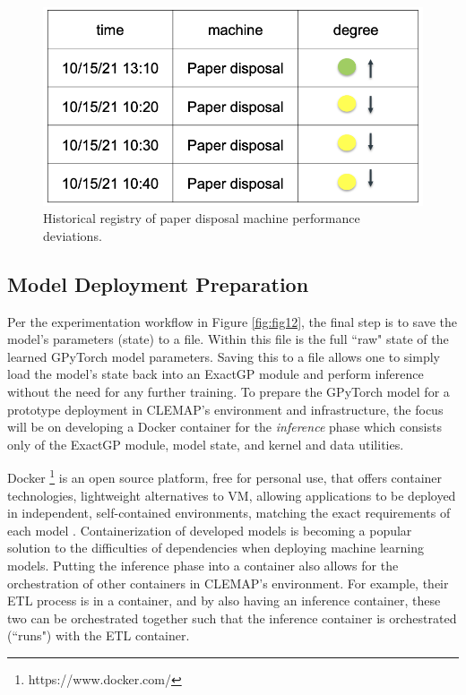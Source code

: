 \begin{figure}[h]
\centering
\graphicspath{ {./images/} }
\includegraphics[scale=0.49]{images/entsorgung_registry.png}
\caption{Historical registry of paper disposal machine performance deviations. }
\label{fig:fig17}
\end{figure}

\subsection{Model Deployment Preparation}

Per the experimentation workflow in Figure \ref{fig:fig12}, the final step is to save the model's parameters (state) to a  file. Within this file is the full ``raw" state of the learned GPyTorch model parameters. Saving this to a file allows one to simply load the model's state back into an ExactGP module and perform inference without the need for any further training. To prepare the GPyTorch model for a prototype deployment in CLEMAP's environment and infrastructure, the focus will be on developing a Docker container for the \textit{inference} phase which consists only of the ExactGP module, model state, and kernel and data utilities.

Docker \footnote[3]{https://www.docker.com/} is an open source platform, free for personal use, that offers container technologies, lightweight alternatives to \ac{VM}, allowing applications to be deployed in independent, self-contained environments, matching the exact requirements of each model \cite{dreyfus-schmidt_introducing_2020}. Containerization of developed models is becoming a popular solution to the difficulties of dependencies when deploying machine learning models. Putting the inference phase into a container also allows for the orchestration of other containers in CLEMAP's environment. For example, their \ac{ETL} process is in a container, and by also having an inference container, these two can be orchestrated together such that the inference container is orchestrated (``runs") with the ETL container.

